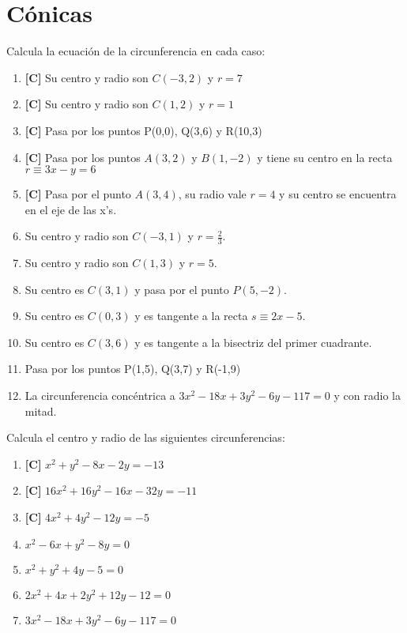 \chapter{Cónicas}
\setcounter{exercicio}{0}

\Exercicio Calcula la ecuación de la circunferencia en cada caso:

\begin{enumerate}[topsep=0pt]
	\item \textbf{[C]} Su centro y radio son $C(-3,2)$ y $r = 7$
	\item \textbf{[C]} Su centro y radio son $C(1,2)$ y $r=1$
	\item \textbf{[C]} Pasa por los puntos P(0,0), Q(3,6) y R(10,3)
	\item \textbf{[C]} Pasa por los puntos $A(3,2)$ y $B(1,-2)$ y tiene su centro en la recta $ r \equiv 3x-y = 6 $
	\item \textbf{[C]} Pasa por el punto $A(3,4)$, su radio vale $r=4$ y su centro se encuentra en el eje de las x's.
	\item Su centro y radio son $C(-3,1)$ y $r = \frac{2}{3}$.
	\item Su centro y radio son $C(1,3)$ y $r=5$.
	\item Su centro es $C(3,1)$ y pasa por el punto $P(5,-2)$.
	\item Su centro es $C(0,3)$ y es tangente a la recta $s \equiv 2x - 5$.
	\item Su centro es $C(3,6)$ y es tangente a la bisectriz del primer cuadrante.
	\item Pasa por los puntos P(1,5), Q(3,7) y R(-1,9)
	\item La circunferencia concéntrica a $3x^2-18x+3y^2-6y-117 = 0$ y con radio la mitad.
\end{enumerate}


\Exercicio Calcula el centro y radio de las siguientes circunferencias:

\begin{enumerate}[topsep=0pt]
	\item \textbf{[C]} $x^2+y^2 -8x -2y = -13$
	\item \textbf{[C]} $16x^2 + 16y^2 -16x -32y = -11 $
	\item \textbf{[C]} $4x^2 + 4y^2 -12y = -5$
	\item $x^2-6x+y^2-8y = 0$
	\item $x^2+y^2+4y-5 = 0$
	\item $2x^2+4x+2y^2+12y-12 = 0$
	\item $3x^2-18x+3y^2-6y-117 = 0$
\end{enumerate}


